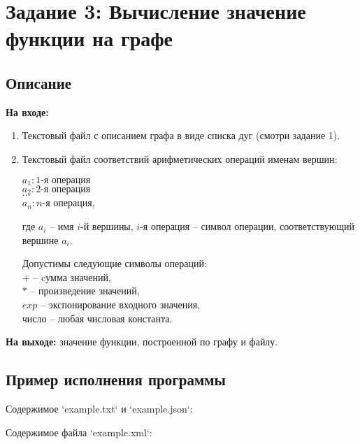 \documentclass[bachelor, och, report]{shiza}
\begin{document}
\section{Задание 3: Вычисление значение функции на графе}
    \subsection{Описание}

        \textbf{На входе:}
        \begin{enumerate}
            \item Текстовый файл с описанием графа в виде списка дуг (смотри задание 1).
            \item Текстовый файл соответствий арифметических операций именам вершин:
            
                \begin{center}
                    $a_1 : 1\text{-я операция}$ \\
                    $a_2 : 2\text{-я операция}$ \\
                    $\dots$ \\
                    $a_n : n\text{-я операция}$, \\
                \end{center}
                где $a_i$ -- имя $i$-й вершины, $i$-я операция -- символ операции, соответствующий вершине $a_i$.
                
                Допустимы следующие символы операций: \\
                $+$ -- cумма значений,\\
                $*$ -- произведение значений,\\
                $exp$ -- экспонирование входного значения,\\
                число -- любая числовая константа.\\		
        \end{enumerate}

        \textbf{На выходе:} значение функции, построенной по графу и файлу.
        

    \subsection{Пример исполнения программы}

        Содержимое `example.txt` и `example.json`:

        Содержимое файла `example.xml`:
\end{document}
